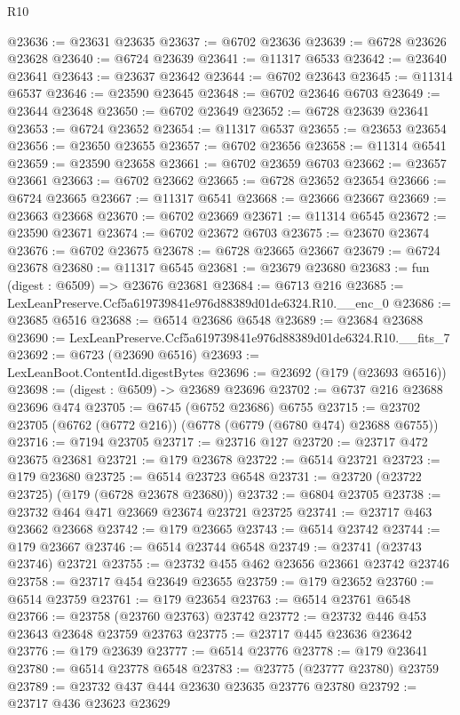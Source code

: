 \begin{lexlean}{R10}
\begin{coremodule}
@23636 := @23631 @23635
@23637 := @6702 @23636
@23639 := @6728 @23626 @23628
@23640 := @6724 @23639
@23641 := @11317 @6533
@23642 := @23640 @23641
@23643 := @23637 @23642
@23644 := @6702 @23643
@23645 := @11314 @6537
@23646 := @23590 @23645
@23648 := @6702 @23646 @6703
@23649 := @23644 @23648
@23650 := @6702 @23649
@23652 := @6728 @23639 @23641
@23653 := @6724 @23652
@23654 := @11317 @6537
@23655 := @23653 @23654
@23656 := @23650 @23655
@23657 := @6702 @23656
@23658 := @11314 @6541
@23659 := @23590 @23658
@23661 := @6702 @23659 @6703
@23662 := @23657 @23661
@23663 := @6702 @23662
@23665 := @6728 @23652 @23654
@23666 := @6724 @23665
@23667 := @11317 @6541
@23668 := @23666 @23667
@23669 := @23663 @23668
@23670 := @6702 @23669
@23671 := @11314 @6545
@23672 := @23590 @23671
@23674 := @6702 @23672 @6703
@23675 := @23670 @23674
@23676 := @6702 @23675
@23678 := @6728 @23665 @23667
@23679 := @6724 @23678
@23680 := @11317 @6545
@23681 := @23679 @23680
@23683 := fun (digest : @6509) => @23676 @23681
@23684 := @6713 @216
@23685 := LexLeanPreserve.Ccf5a619739841e976d88389d01de6324.R10.__enc_0
@23686 := @23685 @6516
@23688 := @6514 @23686 @6548
@23689 := @23684 @23688
@23690 := LexLeanPreserve.Ccf5a619739841e976d88389d01de6324.R10.__fits_7
@23692 := @6723 (@23690 @6516)
@23693 := LexLeanBoot.ContentId.digestBytes
@23696 := @23692 (@179 (@23693 @6516))
@23698 := (digest : @6509) -> @23689 @23696
@23702 := @6737 @216 @23688 @23696 @474
@23705 := @6745 (@6752 @23686) @6755
@23715 := @23702 @23705 (@6762 (@6772 @216)) (@6778 (@6779 (@6780 @474) @23688 @6755))
@23716 := @7194 @23705
@23717 := @23716 @127
@23720 := @23717 @472 @23675 @23681
@23721 := @179 @23678
@23722 := @6514 @23721
@23723 := @179 @23680
@23725 := @6514 @23723 @6548
@23731 := @23720 (@23722 @23725) (@179 (@6728 @23678 @23680))
@23732 := @6804 @23705
@23738 := @23732 @464 @471 @23669 @23674 @23721 @23725
@23741 := @23717 @463 @23662 @23668
@23742 := @179 @23665
@23743 := @6514 @23742
@23744 := @179 @23667
@23746 := @6514 @23744 @6548
@23749 := @23741 (@23743 @23746) @23721
@23755 := @23732 @455 @462 @23656 @23661 @23742 @23746
@23758 := @23717 @454 @23649 @23655
@23759 := @179 @23652
@23760 := @6514 @23759
@23761 := @179 @23654
@23763 := @6514 @23761 @6548
@23766 := @23758 (@23760 @23763) @23742
@23772 := @23732 @446 @453 @23643 @23648 @23759 @23763
@23775 := @23717 @445 @23636 @23642
@23776 := @179 @23639
@23777 := @6514 @23776
@23778 := @179 @23641
@23780 := @6514 @23778 @6548
@23783 := @23775 (@23777 @23780) @23759
@23789 := @23732 @437 @444 @23630 @23635 @23776 @23780
@23792 := @23717 @436 @23623 @23629

\end{coremodule}
\end{lexlean}
